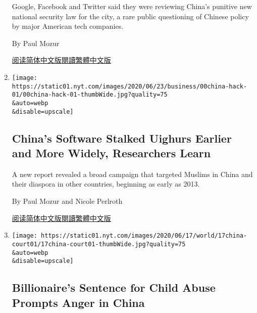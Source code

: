 \begin{enumerate}
  Google, Facebook and Twitter said they were reviewing China's punitive
  new national security law for the city, a rare public questioning of
  Chinese policy by major American tech companies.

  By Paul Mozur

  \href{https://cn.nytimes.com/technology/20200707/facebook-temporarily-stops-hong-kong-data-requests/}{阅读简体中文版}\href{https://cn.nytimes.com/technology/20200707/facebook-temporarily-stops-hong-kong-data-requests/zh-hant/}{閱讀繁體中文版}
\item
  \href{/2020/07/01/technology/china-uighurs-hackers-malware-hackers-smartphones.html}{}

  \texttt{[image: https://static01.nyt.com/images/2020/06/23/business/00china-hack-01/00china-hack-01-thumbWide.jpg?quality=75\\\&auto=webp\\\&disable=upscale]}

  \hypertarget{chinas-software-stalked-uighurs-earlier-and-more-widely-researchers-learn}{%
  \subsection{China's Software Stalked Uighurs Earlier and More Widely,
  Researchers
  Learn}\label{chinas-software-stalked-uighurs-earlier-and-more-widely-researchers-learn}}

  A new report revealed a broad campaign that targeted Muslims in China
  and their diaspora in other countries, beginning as early as 2013.

  By Paul Mozur and Nicole Perlroth

  \href{https://cn.nytimes.com/technology/20200702/china-uighurs-hackers-malware-hackers-smartphones/}{阅读简体中文版}\href{https://cn.nytimes.com/technology/20200702/china-uighurs-hackers-malware-hackers-smartphones/zh}{閱讀繁體中文版}
\item
  \href{/2020/06/17/world/asia/china-wang-zhenhua-sentence.html}{}

  \texttt{[image: https://static01.nyt.com/images/2020/06/17/world/17china-court01/17china-court01-thumbWide.jpg?quality=75\\\&auto=webp\\\&disable=upscale]}

  \hypertarget{billionaires-sentence-for-child-abuse-prompts-anger-in-china}{%
  \subsection{Billionaire's Sentence for Child Abuse Prompts Anger in
  China}\label{billionaires-sentence-for-child-abuse-prompts-anger-in-china}}


\end{enumerate}
